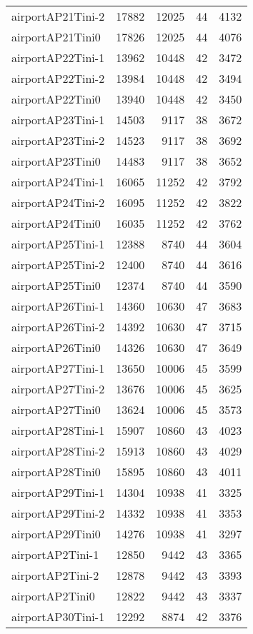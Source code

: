 \begin{longtable}{lrrrr}
airportAP21Tini-2 & 17882 & 12025 & 44 & 4132 \\
airportAP21Tini0 & 17826 & 12025 & 44 & 4076 \\
airportAP22Tini-1 & 13962 & 10448 & 42 & 3472 \\
airportAP22Tini-2 & 13984 & 10448 & 42 & 3494 \\
airportAP22Tini0 & 13940 & 10448 & 42 & 3450 \\
airportAP23Tini-1 & 14503 & 9117 & 38 & 3672 \\
airportAP23Tini-2 & 14523 & 9117 & 38 & 3692 \\
airportAP23Tini0 & 14483 & 9117 & 38 & 3652 \\
airportAP24Tini-1 & 16065 & 11252 & 42 & 3792 \\
airportAP24Tini-2 & 16095 & 11252 & 42 & 3822 \\
airportAP24Tini0 & 16035 & 11252 & 42 & 3762 \\
airportAP25Tini-1 & 12388 & 8740 & 44 & 3604 \\
airportAP25Tini-2 & 12400 & 8740 & 44 & 3616 \\
airportAP25Tini0 & 12374 & 8740 & 44 & 3590 \\
airportAP26Tini-1 & 14360 & 10630 & 47 & 3683 \\
airportAP26Tini-2 & 14392 & 10630 & 47 & 3715 \\
airportAP26Tini0 & 14326 & 10630 & 47 & 3649 \\
airportAP27Tini-1 & 13650 & 10006 & 45 & 3599 \\
airportAP27Tini-2 & 13676 & 10006 & 45 & 3625 \\
airportAP27Tini0 & 13624 & 10006 & 45 & 3573 \\
airportAP28Tini-1 & 15907 & 10860 & 43 & 4023 \\
airportAP28Tini-2 & 15913 & 10860 & 43 & 4029 \\
airportAP28Tini0 & 15895 & 10860 & 43 & 4011 \\
airportAP29Tini-1 & 14304 & 10938 & 41 & 3325 \\
airportAP29Tini-2 & 14332 & 10938 & 41 & 3353 \\
airportAP29Tini0 & 14276 & 10938 & 41 & 3297 \\
airportAP2Tini-1 & 12850 & 9442 & 43 & 3365 \\
airportAP2Tini-2 & 12878 & 9442 & 43 & 3393 \\
airportAP2Tini0 & 12822 & 9442 & 43 & 3337 \\
airportAP30Tini-1 & 12292 & 8874 & 42 & 3376 \\

\end{longtable}
